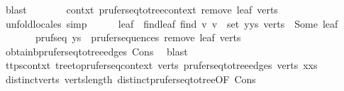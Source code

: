 \begin{isabellebody}
\ blast\isanewline
\ \ \ \ \isamarkupfalse%
\ \isamarkupfalse%
\ contxt{\isacharprime}{\kern0pt}{\isacharcolon}{\kern0pt}\ prufer{\isacharunderscore}{\kern0pt}seq{\isacharunderscore}{\kern0pt}to{\isacharunderscore}{\kern0pt}tree{\isacharunderscore}{\kern0pt}context\ {\isachardoublequoteopen}remove{}\ leaf\ verts{\isachardoublequoteclose}\ \isamarkupfalse%
\ {\isacharparenleft}{\kern0pt}unfold{\isacharunderscore}{\kern0pt}locales{\isacharcomma}{\kern0pt}\ simp{\isacharparenright}{\kern0pt}\isanewline
\ \ \ \ \isamarkupfalse%
\ leaf{}\ \ find{\isacharunderscore}{\kern0pt}leaf{}{\isacharcolon}{\kern0pt}\ {\isachardoublequoteopen}find\ {\isacharparenleft}{\kern0pt}{\isasymlambda}v{\isachardot}{\kern0pt}\ v\ {\isasymnotin}\ set\ {\isacharparenleft}{\kern0pt}y{\isacharhash}{\kern0pt}ys{\isacharparenright}{\kern0pt}{\isacharparenright}{\kern0pt}\ verts\ {\isacharequal}{\kern0pt}\ Some\ leaf{}{\isachardoublequoteclose}\isanewline
\ \ \ \ \ \ \ pruf{\isacharunderscore}{\kern0pt}seq{}{\isacharprime}{\kern0pt}{\isacharcolon}{\kern0pt}\ {\isachardoublequoteopen}ys\ {\isasymin}\ prufer{\isacharunderscore}{\kern0pt}sequences\ {\isacharparenleft}{\kern0pt}remove{}\ leaf{}\ verts{\isacharparenright}{\kern0pt}{\isachardoublequoteclose}\ \isamarkupfalse%
\ obtain{\isacharunderscore}{\kern0pt}b{\isacharunderscore}{\kern0pt}prufer{\isacharunderscore}{\kern0pt}seq{\isacharunderscore}{\kern0pt}to{\isacharunderscore}{\kern0pt}tree{\isacharunderscore}{\kern0pt}edges\ Cons{\isacharparenleft}{\kern0pt}{}{\isacharparenright}{\kern0pt}\ \isamarkupfalse%
\ blast\isanewline
\ \ \ \ \isamarkupfalse%
\ ttps{\isacharunderscore}{\kern0pt}contxt{}{\isacharcolon}{\kern0pt}\ tree{\isacharunderscore}{\kern0pt}to{\isacharunderscore}{\kern0pt}prufer{\isacharunderscore}{\kern0pt}seq{\isacharunderscore}{\kern0pt}context\ verts\ {\isachardoublequoteopen}prufer{\isacharunderscore}{\kern0pt}seq{\isacharunderscore}{\kern0pt}to{\isacharunderscore}{\kern0pt}tree{\isacharunderscore}{\kern0pt}edges\ verts\ {\isacharparenleft}{\kern0pt}x{\isacharhash}{\kern0pt}xs{\isacharparenright}{\kern0pt}{\isachardoublequoteclose}\isanewline
\ \ \ \ \ \ \isamarkupfalse%
\ distinct{\isacharunderscore}{\kern0pt}verts\ verts{\isacharunderscore}{\kern0pt}length\ distinct{\isacharunderscore}{\kern0pt}prufer{\isacharunderscore}{\kern0pt}seq{\isacharunderscore}{\kern0pt}to{\isacharunderscore}{\kern0pt}tree{\isacharbrackleft}{\kern0pt}OF\ Cons{\isacharparenleft}{\kern0pt}{}{\isacharparenright}{\kern0pt}{\isacharbrackright}{\kern0pt}\ \isamarkupfalse%

\end{isabellebody}
